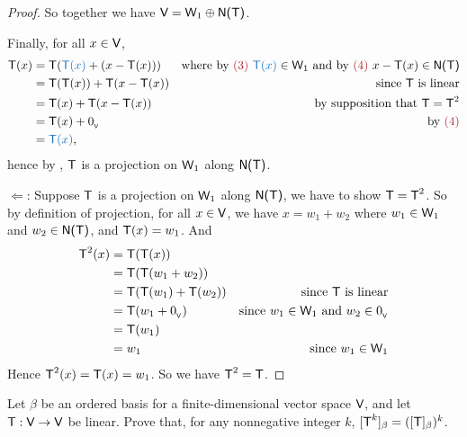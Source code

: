 \begin{proof}
So together we have \(\textsf{V} = \textsf{W}_1 \oplus \textsf{N(T)}\).

Finally, for all \(x \in \textsf{V}\),
\begin{align*}
    \T(x) & = \T(\BLUE{\T(x)} + (x - \T(x))) & \text{where by \MAROON{(3)} \(\BLUE{\T(x)} \in \W_1\) and by \MAROON{(4)} \(x - \T(x) \in \NULLT\)} \\
          & = \T(\T(x)) + \T(x - \T(x)) & \text{since \(\T\) is linear} \\
          & = \T(x) + \T(x - \T(x)) & \text{by supposition that \(\T = \T^2\)} \\
          & = \T(x) + \OV & \text{by \MAROON{(4)}} \\
          & = \BLUE{\T(x)},
\end{align*}
hence by , \(\textsf{T}\) is a projection on \(\textsf{W}_1\) along \(\textsf{N(T)}\).

\(\Longleftarrow\): Suppose \(\textsf{T}\) is a projection on \(\textsf{W}_1\) along \(\textsf{N(T)}\), we have to show \(\textsf{T} = \textsf{T}^2\).
So by definition of projection, for all \(x \in \textsf{V}\), we have \(x = w_1 + w_2\) where \(w_1 \in \textsf{W}_1\) and \(w_2 \in \textsf{N(T)}\), and \(\textsf{T}(x) = w_1\).
And
\begin{align*}
    \textsf{T}^2(x) & = \textsf{T}(\textsf{T}(x)) \\
            & = \textsf{T}(\textsf{T}(w_1 + w_2)) \\
            & = \textsf{T}(\textsf{T}(w_1) + \textsf{T}(w_2)) & \text{since \(\textsf{T}\) is linear} \\
            & = \textsf{T}(w_1 + 0_{_{\textsf{V}}}) & \text{since \(w_1 \in \textsf{W}_1\) and \(w_2 \in 0_{_{\textsf{V}}}\)} \\
            & = \textsf{T}(w_1) \\
            & = w_1 & \text{since \(w_1 \in \textsf{W}_1\)}
\end{align*}
Hence \(\textsf{T}^2(x) = \textsf{T}(x) = w_1\).
So we have \(\textsf{T}^2 = \textsf{T}\).
\end{proof}

\begin{exercise} \label{exercise 2.3.18}
Let \(\beta\) be an ordered basis for a finite-dimensional vector space \(\textsf{V}\), and let \(\textsf{T} : \textsf{V} \to \textsf{V}\) be linear.
Prove that, for any nonnegative integer \(k\),
\([\textsf{T}^k]_{\beta} = ([\textsf{T}]_{\beta})^k\).
\end{exercise}

